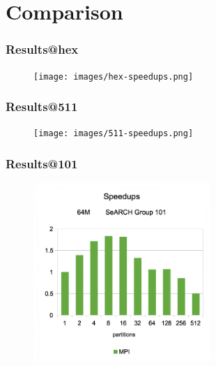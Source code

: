 \documentclass{beamer}
\begin{document}
\section{Comparison}






\begin{frame}
	\frametitle{Results@hex}
	\begin{figure}
		\begin{center}
			\texttt{[image: images/hex-speedups.png]}
		\end{center}
	\end{figure}
\end{frame}









\begin{frame}
	\frametitle{Results@511}
	\begin{figure}
		\begin{center}
			\texttt{[image: images/511-speedups.png]}
		\end{center}
	\end{figure}
\end{frame}








\begin{frame}
	\frametitle{Results@101}
	\begin{figure}
		\begin{center}
			\includegraphics[width=0.6\textwidth]{images/101-speedups-mpi.png}
		\end{center}
	\end{figure}
\end{frame}
\end{document}
